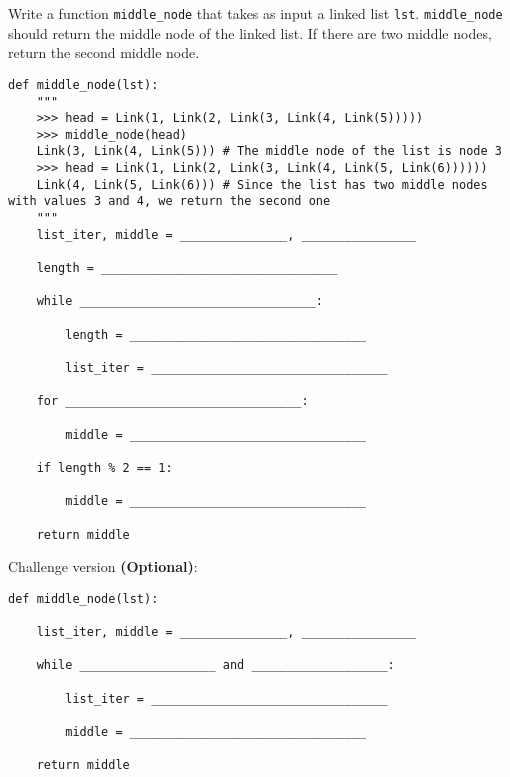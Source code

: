 \begin{blocksection}
\question Write a function \lstinline{middle_node} that takes as input a linked list \lstinline{lst}. \lstinline{middle_node} should return  the middle node of the linked list. If there are two middle nodes, return the second middle node.

\begin{lstlisting}
def middle_node(lst):
    """
    >>> head = Link(1, Link(2, Link(3, Link(4, Link(5)))))
    >>> middle_node(head)
    Link(3, Link(4, Link(5))) # The middle node of the list is node 3
    >>> head = Link(1, Link(2, Link(3, Link(4, Link(5, Link(6))))))
    Link(4, Link(5, Link(6))) # Since the list has two middle nodes with values 3 and 4, we return the second one
    """
    list_iter, middle = _______________, ________________
    
    length = _________________________________

    while _________________________________:

        length = _________________________________

        list_iter = _________________________________
    
    for _________________________________:

        middle = _________________________________
    
    if length % 2 == 1:

        middle = _________________________________

    return middle  

\end{lstlisting}  


Challenge version \textbf{(Optional)}:
\begin{lstlisting}
def middle_node(lst):

    list_iter, middle = _______________, ________________

    while ___________________ and ___________________:

        list_iter = _________________________________

        middle = _________________________________

    return middle

\end{lstlisting}
\end{blocksection}

